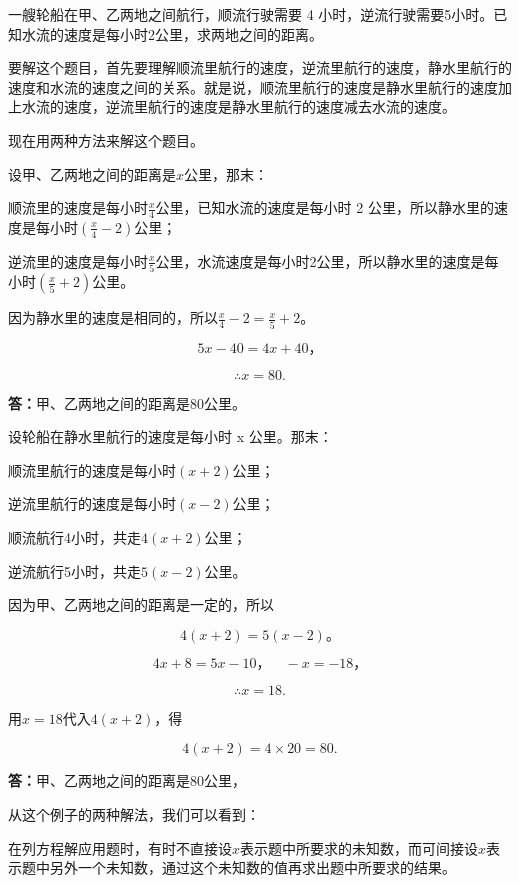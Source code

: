 一艘轮船在甲、乙两地之间航行，顺流行驶需要 4
小时，逆流行驶需要5小时。已知水流的速度是每小时2公里，求两地之间的距离。


要解这个题目，首先要理解顺流里航行的速度，逆流里航行的速度，静水里航行的速度和水流的速度之间的关系。就是说，顺流里航行的速度是静水里航行的速度加上水流的速度，逆流里航行的速度是静水里航行的速度减去水流的速度。

现在用两种方法来解这个题目。


设甲、乙两地之间的距离是\(x\)公里，那末：

顺流里的速度是每小时\(\frac{x}{4}\)公里，已知水流的速度是每小时 2
公里，所以静水里的速度是每小时\(\left(\frac{x}{4} - 2\right)\)公里；

逆流里的速度是每小时\(\frac{x}{5}\)公里，水流速度是每小时2公里，所以静水里的速度是每小时\(\left(\frac{x}{5} + 2\right)\)公里。

因为静水里的速度是相同的，所以\(\frac{x}{4}-2=\frac{x}{5}+2\)。

\[
5 x - 40 = 4 x + 40\text{，}
\]

\[
\therefore x = 80.
\]

\textbf{答：}甲、乙两地之间的距离是80公里。

 设轮船在静水里航行的速度是每小时 x 公里。那末：

顺流里航行的速度是每小时\((x + 2)\)公里；

逆流里航行的速度是每小时\((x - 2)\)公里；

顺流航行4小时，共走\(4(x+2)\)公里；

逆流航行5小时，共走\(5(x-2)\)公里。

因为甲、乙两地之间的距离是一定的，所以

\[
4 (x + 2) = 5 (x - 2)\text{。}
\]

\[
4 x + 8 = 5 x - 10\text{，} \quad - x = - 18\text{，}
\]

\[
\therefore x = 18.
\]

用\(x = 18\)代入\(4(x + 2)\)，得

\[
4 (x + 2) = 4 \times 20 = 80.
\]

\textbf{答：}甲、乙两地之间的距离是80公里，

从这个例子的两种解法，我们可以看到：

在列方程解应用题时，有时不直接设\(x\)表示题中所要求的未知数，而可间接设\(x\)表示题中另外一个未知数，通过这个未知数的值再求出题中所要求的结果。


